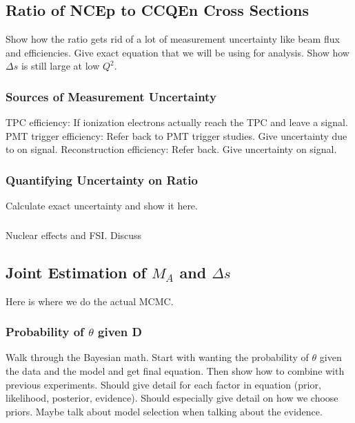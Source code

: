 \subsection{Ratio of NCEp to CCQEn Cross Sections}\label{ratios}
  Show how the ratio gets rid of a lot of measurement uncertainty like beam
  flux and efficiencies. Give exact equation that we will be using for
  analysis. Show how $\Delta s$ is still large at low $Q^2$.
  \subsubsection{Sources of Measurement Uncertainty}
    TPC efficiency: If ionization electrons actually reach the
    TPC and leave a signal.
    PMT trigger efficiency: Refer back to PMT trigger studies. Give uncertainty due to on signal.
    Reconstruction efficiency: Refer back. Give uncertainty on signal.
  \subsubsection{Quantifying Uncertainty on Ratio}\label{errorcalc}
    Calculate exact uncertainty and show it here.
  \subsubsection{}
    Nuclear effects and FSI. Discuss 



\subsection{Joint Estimation of $M_A$ and $\Delta s$}\label{deltas}
  Here is where we do the actual MCMC.
  \subsubsection{Probability of $\theta$ given D}
    Walk through the Bayesian math. Start with wanting the probability of
    $\theta$ given the data and the model and get final equation. Then show how
    to combine with previous experiments. Should give detail for each factor in
    equation (prior, likelihood, posterior, evidence). Should especially give
    detail on how we choose priors. Maybe talk about model selection when
    talking about the evidence.
